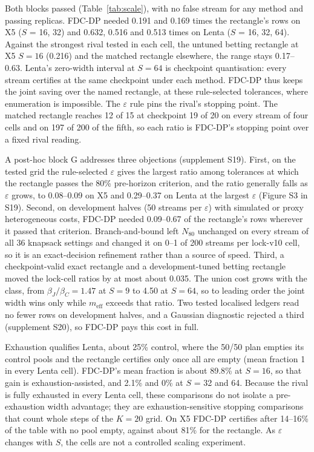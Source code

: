 \documentclass[sigconf,anonymous,review]{acmart}
\newcommand{\eps}{\varepsilon}
\newcommand{\meff}{m_{\text{eff}}}
\begin{document}
Both blocks passed (Table~\ref{tab:scale}), with no false stream for any method and passing replicas. FDC-DP needed 0.191 and 0.169 times the rectangle's rows on X5 ($S$ = 16, 32) and 0.632, 0.516 and 0.513 times on Lenta ($S$ = 16, 32, 64). Against the strongest rival tested in each cell, the untuned betting rectangle at X5 $S = 16$ (0.216) and the matched rectangle elsewhere, the range stays 0.17--0.63. Lenta's zero-width interval at $S = 64$ is checkpoint quantisation: every stream certifies at the same checkpoint under each method. FDC-DP thus keeps the joint saving over the named rectangle, at these rule-selected tolerances, where enumeration is impossible. The $\eps$ rule pins the rival's stopping point. The matched rectangle reaches 12 of 15 at checkpoint 19 of 20 on every stream of four cells and on 197 of 200 of the fifth, so each ratio is FDC-DP's stopping point over a fixed rival reading.

A post-hoc block G addresses three objections (supplement S19). First, on the tested grid the rule-selected $\eps$ gives the largest ratio among tolerances at which the rectangle passes the 80\% pre-horizon criterion, and the ratio generally falls as $\eps$ grows, to 0.08--0.09 on X5 and 0.29--0.37 on Lenta at the largest $\eps$ (Figure S3 in S19). Second, on development halves (50 streams per $\eps$) with simulated or proxy heterogeneous costs, FDC-DP needed 0.09--0.67 of the rectangle's rows wherever it passed that criterion. Branch-and-bound left $N_{80}$ unchanged on every stream of all 36 knapsack settings and changed it on 0--1 of 200 streams per lock-v10 cell, so it is an exact-decision refinement rather than a source of speed. Third, a checkpoint-valid exact rectangle and a development-tuned betting rectangle moved the lock-cell ratios by at most about 0.035. The union cost grows with the class, from $\beta_J/\beta_C = 1.47$ at $S = 9$ to 4.50 at $S = 64$, so to leading order the joint width wins only while $\meff$ exceeds that ratio. Two tested localised ledgers read no fewer rows on development halves, and a Gaussian diagnostic rejected a third (supplement S20), so FDC-DP pays this cost in full.

Exhaustion qualifies Lenta, about 25\% control, where the 50/50 plan empties its control pools and the rectangle certifies only once all are empty (mean fraction 1 in every Lenta cell). FDC-DP's mean fraction is about 89.8\% at $S = 16$, so that gain is exhaustion-assisted, and 2.1\% and 0\% at $S$ = 32 and 64. Because the rival is fully exhausted in every Lenta cell, these comparisons do not isolate a pre-exhaustion width advantage; they are exhaustion-sensitive stopping comparisons that count whole steps of the $K = 20$ grid. On X5 FDC-DP certifies after 14--16\% of the table with no pool empty, against about 81\% for the rectangle. As $\eps$ changes with $S$, the cells are not a controlled scaling experiment.
\end{document}
